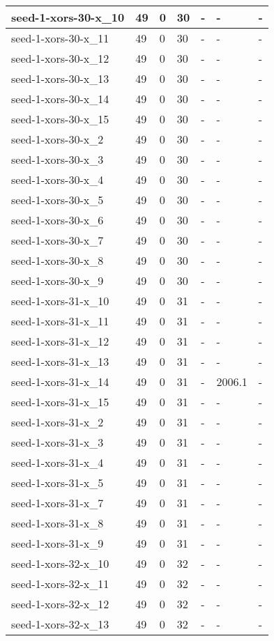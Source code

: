 \begin{scriptsize}
\begin{longtable}{|p{5cm}|l|l|l|l|l|l|}
seed-1-xors-30-x\_10&49&0&30&-&-&- \\ \hline 
seed-1-xors-30-x\_11&49&0&30&-&-&- \\ \hline 
seed-1-xors-30-x\_12&49&0&30&-&-&- \\ \hline 
seed-1-xors-30-x\_13&49&0&30&-&-&- \\ \hline 
seed-1-xors-30-x\_14&49&0&30&-&-&- \\ \hline 
seed-1-xors-30-x\_15&49&0&30&-&-&- \\ \hline 
seed-1-xors-30-x\_2&49&0&30&-&-&- \\ \hline 
seed-1-xors-30-x\_3&49&0&30&-&-&- \\ \hline 
seed-1-xors-30-x\_4&49&0&30&-&-&- \\ \hline 
seed-1-xors-30-x\_5&49&0&30&-&-&- \\ \hline 
seed-1-xors-30-x\_6&49&0&30&-&-&- \\ \hline 
seed-1-xors-30-x\_7&49&0&30&-&-&- \\ \hline 
seed-1-xors-30-x\_8&49&0&30&-&-&- \\ \hline 
seed-1-xors-30-x\_9&49&0&30&-&-&- \\ \hline 
seed-1-xors-31-x\_10&49&0&31&-&-&- \\ \hline 
seed-1-xors-31-x\_11&49&0&31&-&-&- \\ \hline 
seed-1-xors-31-x\_12&49&0&31&-&-&- \\ \hline 
seed-1-xors-31-x\_13&49&0&31&-&-&- \\ \hline 
seed-1-xors-31-x\_14&49&0&31&-&2006.1&- \\ \hline 
seed-1-xors-31-x\_15&49&0&31&-&-&- \\ \hline 
seed-1-xors-31-x\_2&49&0&31&-&-&- \\ \hline 
seed-1-xors-31-x\_3&49&0&31&-&-&- \\ \hline 
seed-1-xors-31-x\_4&49&0&31&-&-&- \\ \hline 
seed-1-xors-31-x\_5&49&0&31&-&-&- \\ \hline 
seed-1-xors-31-x\_7&49&0&31&-&-&- \\ \hline 
seed-1-xors-31-x\_8&49&0&31&-&-&- \\ \hline 
seed-1-xors-31-x\_9&49&0&31&-&-&- \\ \hline 
seed-1-xors-32-x\_10&49&0&32&-&-&- \\ \hline 
seed-1-xors-32-x\_11&49&0&32&-&-&- \\ \hline 
seed-1-xors-32-x\_12&49&0&32&-&-&- \\ \hline 
seed-1-xors-32-x\_13&49&0&32&-&-&- \\ \hline 

\end{longtable}
\end{scriptsize}
